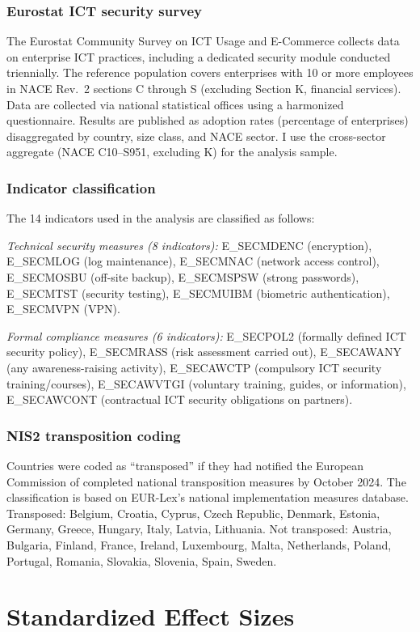 \documentclass[12pt]{article}
\begin{document}
\subsubsection*{Eurostat ICT security survey} The Eurostat Community Survey on ICT Usage and E-Commerce collects data on enterprise ICT practices, including a dedicated security module conducted triennially. The reference population covers enterprises with 10 or more employees in NACE Rev.~2 sections C through S (excluding Section K, financial services). Data are collected via national statistical offices using a harmonized questionnaire. Results are published as adoption rates (percentage of enterprises) disaggregated by country, size class, and NACE sector. I use the cross-sector aggregate (NACE C10--S951, excluding K) for the analysis sample.

\subsubsection*{Indicator classification} The 14 indicators used in the analysis are classified as follows:

\textit{Technical security measures (8 indicators):} E\_SECMDENC (encryption), E\_SECMLOG (log maintenance), E\_SECMNAC (network access control), E\_SECMOSBU (off-site backup), E\_SECMSPSW (strong passwords), E\_SECMTST (security testing), E\_SECMUIBM (biometric authentication), E\_SECMVPN (VPN).

\textit{Formal compliance measures (6 indicators):} E\_SECPOL2 (formally defined ICT security policy), E\_SECMRASS (risk assessment carried out), E\_SECAWANY (any awareness-raising activity), E\_SECAWCTP (compulsory ICT security training/courses), E\_SECAWVTGI (voluntary training, guides, or information), E\_SECAWCONT (contractual ICT security obligations on partners).

\subsubsection*{NIS2 transposition coding} Countries were coded as ``transposed'' if they had notified the European Commission of completed national transposition measures by October 2024. The classification is based on EUR-Lex's national implementation measures database. Transposed: Belgium, Croatia, Cyprus, Czech Republic, Denmark, Estonia, Germany, Greece, Hungary, Italy, Latvia, Lithuania. Not transposed: Austria, Bulgaria, Finland, France, Ireland, Luxembourg, Malta, Netherlands, Poland, Portugal, Romania, Slovakia, Slovenia, Spain, Sweden.


\section{Standardized Effect Sizes}
\label{sec:sde}


\end{document}
